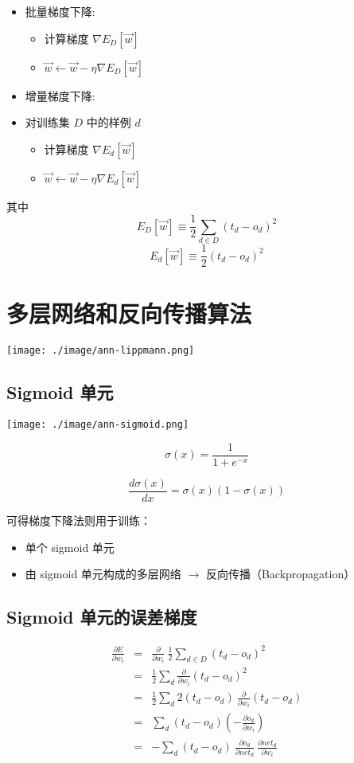 \documentclass{article}
\begin{document}
\begin{itemize}
\item 批量梯度下降:
\begin{itemize}
\item 计算梯度 $\nabla E_{D}[\vec{w}]$
\item $\vec{w} \leftarrow \vec{w} -\eta \nabla E_{D}[\vec{w}]$
\end{itemize}
\item 增量梯度下降:
\item 对训练集 $D$ 中的样例 $d$
\begin{itemize}
\item 计算梯度 $\nabla E_{d}[\vec{w}]$
\item $\vec{w} \leftarrow \vec{w} -\eta \nabla E_{d}[\vec{w}]$
\end{itemize}
\end{itemize}

其中
       \[E_{D}[\vec{w}] \equiv  \frac{1}{2}\sum_{d \in D}(t_{d} - o_{d})^{2}\]
       \[E_{d}[\vec{w}] \equiv  \frac{1}{2}(t_{d} - o_{d})^{2}\]
\section{多层网络和反向传播算法}
\label{sec-6}


  \texttt{[image: ./image/ann-lippmann.png]}
\subsection{Sigmoid 单元}
\label{sec-6-1}


\texttt{[image: ./image/ann-sigmoid.png]}

$$\sigma(x)= \frac{1}{1 + e^{-x}} $$

$$\frac{d \sigma(x)}{dx} = \sigma(x) (1 - \sigma(x))$$


可得梯度下降法则用于训练：
\begin{itemize}
\item 单个 sigmoid 单元
\item 由 sigmoid 单元构成的多层网络  $\rightarrow$ 反向传播（Backpropagation）
\end{itemize}
\subsection{Sigmoid 单元的误差梯度}
\label{sec-6-2}


\begin{eqnarray}
\frac{\partial E}{\partial w_{i}} & = & \frac{\partial}{\partial w_{i}}\ 
\frac{1}{2}\sum_{d\in D}(t_{d} - o_{d})^{2} \nonumber\\
 & = & \frac{1}{2}\sum_{d}\frac{\partial}{\partial w_{i}}
  (t_{d} - o_{d})^{2} \nonumber\\
 & = & \frac{1}{2}\sum_{d} 2 (t_{d} - o_{d}) \ 
\frac{\partial}{\partial w_{i}}(t_{d} - o_{d}) \nonumber\\
 & = & \sum_{d} (t_{d} - o_{d}) \left( - \frac{\partial o_{d}}{\partial
w_{i}}\right) \nonumber\\
& = & - \sum_{d} (t_{d} - o_{d})\ \frac{\partial o_{d}}{\partial
net_{d}}\ \frac{\partial net_{d}}{\partial w_{i}} \nonumber
\end{eqnarray}
\end{document}
